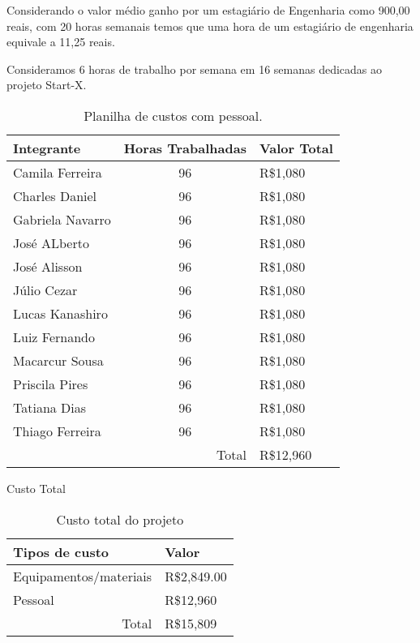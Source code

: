 Considerando o valor médio ganho por um estagiário de Engenharia como 900,00 reais,
com 20 horas semanais temos que uma hora de um estagiário de engenharia equivale a
11,25 reais.

Consideramos 6 horas de trabalho por semana em 16 semanas dedicadas ao projeto Start-X.

\begin{table}[h]
\centering
\begin{tabular}{|l|c|l|}
\hline
Integrante       & \multicolumn{1}{l|}{Horas Trabalhadas} & Valor Total \\ \hline
Camila Ferreira  & 96                                     & R\$1,080     \\ \hline
Charles Daniel   & 96                                     & R\$1,080     \\ \hline
Gabriela Navarro & 96                                     & R\$1,080     \\ \hline
José ALberto     & 96                                     & R\$1,080     \\ \hline
José Alisson     & 96                                     & R\$1,080     \\ \hline
Júlio Cezar      & 96                                     & R\$1,080     \\ \hline
Lucas Kanashiro  & 96                                     & R\$1,080     \\ \hline
Luiz Fernando    & 96                                     & R\$1,080     \\ \hline
Macarcur Sousa   & 96                                     & R\$1,080     \\ \hline
Priscila Pires   & 96                                     & R\$1,080     \\ \hline
Tatiana Dias     & 96                                     & R\$1,080     \\ \hline
Thiago Ferreira  & 96                                     & R\$1,080     \\ \hline
\multicolumn{2}{|r|}{Total}                               & R\$12,960    \\ \hline
\end{tabular}
\caption{Planilha de custos com pessoal.}
\end{table}

Custo Total

\begin{table}[h]
\centering
\begin{tabular}{|l|l|}
\hline
Tipos de custo              & Valor       \\ \hline
Equipamentos/materiais      & R\$2,849.00 \\ \hline
Pessoal                     & R\$12,960   \\ \hline
\multicolumn{1}{|r|}{Total} & R\$15,809   \\ \hline
\end{tabular}
\caption{Custo total do projeto}
\end{table}


 
 
